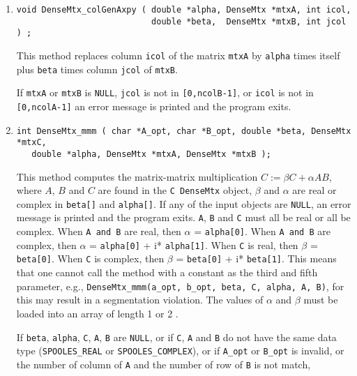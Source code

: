 \begin{enumerate}
\item
\begin{verbatim}
void DenseMtx_colGenAxpy ( double *alpha, DenseMtx *mtxA, int icol,   
                           double *beta,  DenseMtx *mtxB, int jcol ) ;
\end{verbatim}
\par
This method replaces column {\tt icol} of the matrix {\tt mtxA} by
{\tt alpha} times itself plus {\tt beta} times column {\tt jcol}
of {\tt mtxB}.
\par {}
If {\tt mtxA} or {\tt mtxB} is {\tt NULL}, {\tt jcol} is not in 
{\tt [0,ncolB-1]}, or {\tt icol} is not in {\tt [0,ncolA-1]} 
an error message is printed and the program exits.
\item
\begin{verbatim}
int DenseMtx_mmm ( char *A_opt, char *B_opt, double *beta, DenseMtx *mtxC,
   double *alpha, DenseMtx *mtxA, DenseMtx *mtxB );
\end{verbatim}
This method computes the matrix-matrix multiplication 
$C := \beta C + \alpha AB$,
where $A$, $B$ and $C$ are found in the {\tt C DenseMtx} object,
$\beta$ and $\alpha$ are real or complex in {\tt beta[]} and {\tt alpha[]}.
If any of the input objects are {\tt NULL}, an error message is
printed and the program exits.
{\tt A}, {\tt B} and {\tt C} must all be real or all be complex.
When {\tt A and \tt B} are real, then $\alpha$ = {\tt alpha[0]}.
When {\tt A and \tt B} are complex, then $\alpha$ =
{\tt alpha[0]} + i* {\tt alpha[1]}.
When {\tt C} is real, then $\beta$ = {\tt beta[0]}.
When {\tt C} is complex, then $\beta$ =
{\tt beta[0]} + i* {\tt beta[1]}.
This means that one cannot call the method with a constant as the
third and fifth parameter, e.g.,
{\tt DenseMtx\_mmm(a\_opt, b\_opt, beta, C, alpha, A, B)},
for this may result in a segmentation violation.
The values of $\alpha$ and $\beta$ must be loaded into an array of length 1 or 2
.
\par {}
If {\tt beta}, {\tt alpha}, {\tt C}, {\tt A}, {\tt B} are {\tt NULL},
or if {\tt C}, {\tt A} and {\tt B} do not have the same data type
({\tt SPOOLES\_REAL} or {\tt SPOOLES\_COMPLEX}),
or if {\tt A\_opt} or {\tt B\_opt} is invalid, or 
the number of column of {\tt A} and the number of row of {\tt B} is not match, 

\end{enumerate}
